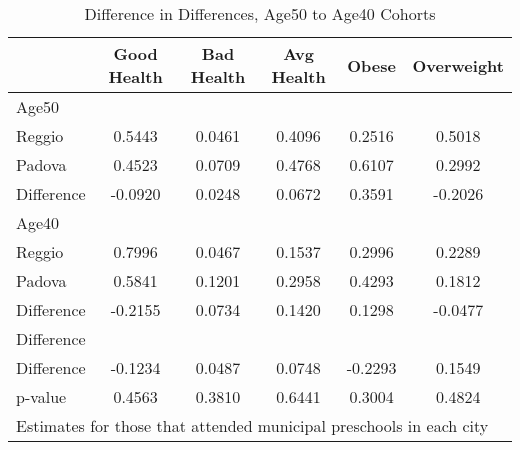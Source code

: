 \begin{table}[htbp]\centering
\caption{Difference in Differences, Age50 to Age40 Cohorts}
\begin{tabular}{l*{5}{c}}
\hline\hline
            & Good Health&  Bad Health&  Avg Health&       Obese&  Overweight\\
\hline
Age50       &            &            &            &            &            \\
Reggio      &      0.5443&      0.0461&      0.4096&      0.2516&      0.5018\\
Padova      &      0.4523&      0.0709&      0.4768&      0.6107&      0.2992\\
Difference  &     -0.0920&      0.0248&      0.0672&      0.3591&     -0.2026\\
\hline
Age40       &            &            &            &            &            \\
Reggio      &      0.7996&      0.0467&      0.1537&      0.2996&      0.2289\\
Padova      &      0.5841&      0.1201&      0.2958&      0.4293&      0.1812\\
Difference  &     -0.2155&      0.0734&      0.1420&      0.1298&     -0.0477\\
\hline
Difference  &            &            &            &            &            \\
Difference  &     -0.1234&      0.0487&      0.0748&     -0.2293&      0.1549\\
p-value     &      0.4563&      0.3810&      0.6441&      0.3004&      0.4824\\
\hline\hline
\multicolumn{6}{l}{\footnotesize Estimates for those that attended municipal preschools in each city}\\
\end{tabular}
\end{table}
